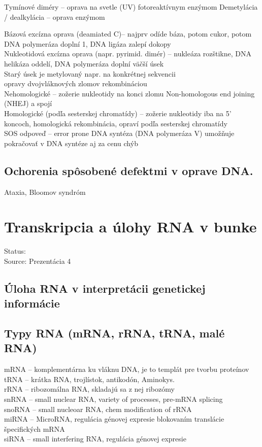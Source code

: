 Tymínové diméry -- oprava na svetle (UV) fotoreaktívnym enzýmom
Demetylácia / dealkylácia -- oprava enzýmom

Bázová excízna oprava (deamiated C)-- najprv odíde báza, potom cukor, potom DNA polymeráza doplní 1, DNA ligáza zalepí dokopy\\
Nukleotidová excízna oprava (napr. pyrimid. dimér) -- nukleáza rozštikne, DNA helikáza oddelí, DNA polymeráza doplní väčší úsek\\
Starý úsek je metylovaný napr. na konkrétnej sekvencii\\

opravy dvojvláknových zlomov rekombináciou\\
\tab Nehomologické -- zožerie nukleotidy na konci zlomu Non-homologous end joining (NHEJ) a spojí\\
\tab Homologické (podľa sesterskej chromatídy) -- zožerie nukleotidy iba na 5' koncoch, homologická rekombinácia, opraví podľa sesterskej chromatídy\\

SOS odpoveď -- error prone DNA syntéza (DNA polymeráza V) umožňuje pokračovať v DNA syntéze aj za cenu chýb\\
\subsection{Ochorenia spôsobené defektmi v oprave DNA. }
Ataxia, Bloomov syndróm

\section{Transkripcia a úlohy RNA v bunke}

Status: \\
Source: Prezentácia 4\\

\subsection{Úloha RNA v interpretácii genetickej informácie}

\subsection{Typy RNA (mRNA, rRNA, tRNA, malé RNA)}
mRNA -- komplementárna ku vláknu DNA, je to templát pre tvorbu proteínov\\
tRNA -- krátka RNA, trojlístok, antikodón, Aminokys. \\
rRNA -- ribozomálna RNA, skladajú sa z nej ribozómy\\
snRNA -- small nuclear RNA, variety of processes, pre-mRNA splicing\\
snoRNA -- small nucleoar RNA, chem modification of rRNA\\
miRNA -- MicroRNA, regulácia génovej expresie blokovaním translácie špecifických mRNA\\
siRNA -- small interfering RNA, regulácia génovej expresie\\
